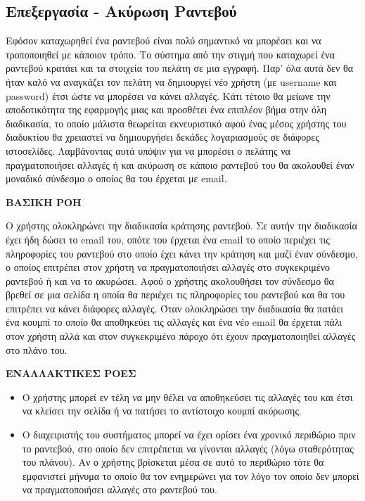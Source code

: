 \subsection{Επεξεργασία - Ακύρωση Ραντεβού}
Εφόσον καταχωρηθεί ένα ραντεβού είναι πολύ σημαντικό να μπορέσει και να τροποποιηθεί με κάποιον τρόπο. Το σύστημα από την στιγμή που καταχωρεί ένα ραντεβού κρατάει και τα στοιχεία του πελάτη σε μια εγγραφή. Παρ' όλα αυτά δεν θα ήταν καλό να αναγκάζει τον πελάτη να δημιουργεί νέο χρήστη (με username και password) έτσι ώστε να μπορέσει να κάνει αλλαγές. Κάτι τέτοιο θα μείωνε την αποδοτικότητα της εφαρμογής μιας και προσθέτει ένα επιπλέον βήμα στην όλη διαδικασία, το οποίο μάλιστα θεωρείται εκνευριστικό αφού ένας μέσος χρήστης του διαδυκτίου θα χρειαστεί να δημιουργήσει δεκάδες λογαριασμούς σε διάφορες ιστοσελίδες. Λαμβάνοντας αυτά υπόψιν για να μπορέσει ο πελάτης να πραγματοποιήσει αλλαγές ή και ακύρωση σε κάποιο ραντεβού του θα ακολουθεί έναν μοναδικό σύνδεσμο ο οποίος θα του έρχεται με email.

\textbf{ΒΑΣΙΚΗ ΡΟΗ}

Ο χρήστης ολοκληρώνει την διαδικασία κράτησης ραντεβού. Σε αυτήν την διαδικασία έχει ήδη δώσει το email του, οπότε του έρχεται ένα email το οποίο περιέχει τις πληροφορίες του ραντεβού στο οποίο έχει κάνει την κράτηση και μαζί έναν σύνδεσμο, ο οποίος επιτρέπει στον χρήστη να πραγματοποιήσει αλλαγές στο συγκεκριμένο ραντεβού ή και να το ακυρώσει. Αφού ο χρήστης ακολουθήσει τον σύνδεσμο θα βρεθεί σε μια σελίδα η οποία θα περιέχει τις πληροφορίες του ραντεβού και θα του επιτρέπει να κάνει διάφορες αλλαγές. Όταν ολοκληρώσει την διαδικασία θα πατάει ένα κουμπί το οποίο θα αποθηκεύει τις αλλαγές και ένα νέο email θα έρχεται πάλι στον χρήστη αλλά και στον συγκεκριμένο πάροχο ότι έχουν πραγματοποιηθεί αλλαγές στο πλάνο του.

\textbf{ΕΝΑΛΛΑΚΤΙΚΕΣ ΡΟΕΣ}

\begin{itemize}
\item Ο χρήστης μπορεί εν τέλη να μην θέλει να αποθηκεύσει τις αλλαγές του και έτσι να κλείσει την σελίδα ή να πατήσει το αντίστοιχο κουμπί ακύρωσης.
\item Ο διαχειριστής του συστήματος μπορεί να έχει ορίσει ένα χρονικό περιθώριο πριν το ραντεβού, στο οποίο δεν επιτρέπεται να γίνονται αλλαγές (λόγω σταθερότητας του πλάνου). Αν ο χρήστης βρίσκεται μέσα σε αυτό το περιθώριο τότε θα εμφανιστεί μήνυμα το οποίο θα τον ενημερώνει για τον λόγο τον οποίο δεν μπορεί να πραγματοποιήσει αλλαγές στο ραντεβού του. 
\end{itemize}

